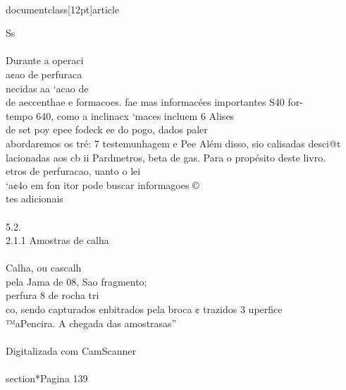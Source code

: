 \\documentclass[12pt]{article}
\begin{document}
Ss\\
\\
Durante a operaci\\
a¢ao de perfuraca\\
necidas aa ‘acao de\\
de aeccenthae e formacoes. fae mas informacées importantes S40 for-\\
tempo 640, como a inclinacx ‘maces incluem 6 Alises\\
de set poy epee fodeck ee do pogo, dados paler\\
abordaremos os tré: 7 testemunhagem e Pee Além disso, sio  calisadas desci@t\\
lacionadas aos cb ii Pardmetros, beta de gas. Para o propésito deste livro.\\
etros de perfuracao, uanto o lei\\
‘a¢4o em fon itor pode buscar informagoes ©\\
tes adicionais\\
\\
5.2.\\
2.1.1 Amostras de calha\\
\\
Calha, ou cascalh\\
pela Jama de 08, Sao fragmento;\\
perfura 8 de rocha tri\\
co, sendo capturados enbitrados pela broca ¢ trazidos 3 uperfice\\
™aPencira. A chegada das amostrasas”\\
\\
Digitalizada com CamScanner\\

\\section*{Pagina 139}
\end{document}
